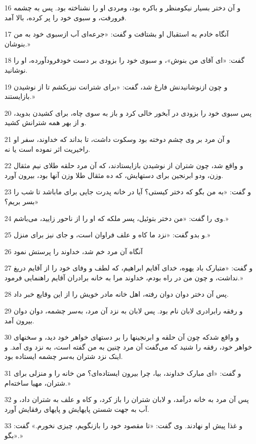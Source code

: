 \par 16 و آن دختر بسیار نیکومنظر و باکره بود، ومردی او را نشناخته بود. پس به چشمه فرورفت، و سبوی خود را پر کرده، بالا آمد.
\par 17 آنگاه خادم به استقبال او بشتافت و گفت: «جرعه‌ای آب ازسبوی خود به من بنوشان.»
\par 18 گفت: «ای آقای من بنوش»، و سبوی خود را بزودی بر دست خودفرودآورده، او را نوشانید.
\par 19 و چون ازنوشانیدنش فارغ شد، گفت: «برای شترانت نیزبکشم تا از نوشیدن بازایستند.»
\par 20 پس سبوی خود را بزودی در آبخور خالی کرد و باز به سوی چاه، برای کشیدن بدوید، و از بهر همه شترانش کشید.
\par 21 و آن مرد بر وی چشم دوخته بود وسکوت داشت، تا بداند که خداوند، سفر او راخیریت اثر نموده است یا نه.
\par 22 و واقع شد، چون شتران از نوشیدن بازایستادند، که آن مرد حلقه طلای نیم مثقال وزن، ودو ابرنجین برای دستهایش، که ده مثقال طلا وزن آنها بود، بیرون آورد.
\par 23 و گفت: «به من بگو که دختر کیستی؟ آیا در خانه پدرت جایی برای ماباشد تا شب را بسر بریم؟»
\par 24 وی را گفت: «من دختر بتوئیل، پسر ملکه که او را از ناحور زایید، می‌باشم.»
\par 25 و بدو گفت: «نزد ما کاه و علف فراوان است، و جای نیز برای منزل.»
\par 26 آنگاه آن مرد خم شد، خداوند را پرستش نمود
\par 27 و گفت: «متبارک باد یهوه، خدای آقایم ابراهیم، که لطف و وفای خود را از آقایم دریغ نداشت، و چون من در راه بودم، خداوند مرا به خانه برادران آقایم راهنمایی فرمود.»
\par 28 پس آن دختر دوان دوان رفته، اهل خانه مادر خویش را از این وقایع خبر داد.
\par 29 و رفقه رابرادری لابان نام بود. پس لابان به نزد آن مرد، به‌سر چشمه، دوان دوان بیرون آمد.
\par 30 و واقع شدکه چون آن حلقه و ابرنجینها را بر دستهای خواهر خود دید، و سخنهای خواهر خود، رفقه را شنید که می‌گفت آن مرد چنین به من گفته است، به نزد وی آمد. و اینک نزد شتران به‌سر چشمه ایستاده بود.
\par 31 و گفت: «ای مبارک خداوند، بیا، چرا بیرون ایستاده‌ای؟ من خانه را و منزلی برای شتران، مهیا ساخته‌ام.»
\par 32 پس آن مرد به خانه درآمد، و لابان شتران را باز کرد، و کاه و علف به شتران داد، و آب به جهت شستن پایهایش و پایهای رفقایش آورد.
\par 33 و غذا پیش او نهادند. وی گفت: «تا مقصود خود را بازنگویم، چیزی نخورم.» گفت: «بگو.»
